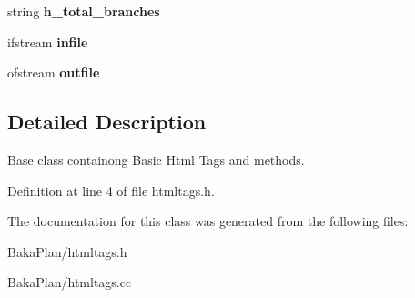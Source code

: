 \begin{DoxyCompactItemize}
\item 
\hypertarget{classHTMLTags_a71789f292e6d0dc11baa1e778bbb08c9}{string {\bfseries h\-\_\-total\-\_\-branches}}\label{classHTMLTags_a71789f292e6d0dc11baa1e778bbb08c9}

\item 
\hypertarget{classHTMLTags_ad72c63f88e720e8a23e457146d208578}{ifstream {\bfseries infile}}\label{classHTMLTags_ad72c63f88e720e8a23e457146d208578}

\item 
\hypertarget{classHTMLTags_a28fab1433a342a8862152c87959c03c3}{ofstream {\bfseries outfile}}\label{classHTMLTags_a28fab1433a342a8862152c87959c03c3}

\end{DoxyCompactItemize}


\subsection{Detailed Description}
Base class containong Basic Html Tags and methods. 

Definition at line 4 of file htmltags.\-h.



The documentation for this class was generated from the following files\-:\begin{DoxyCompactItemize}
\item 
Baka\-Plan/htmltags.\-h\item 
Baka\-Plan/htmltags.\-cc\end{DoxyCompactItemize}
